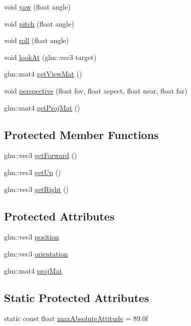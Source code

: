 \begin{DoxyCompactItemize}
void \hyperlink{class_camera_ab4eab94754431725c572d528a07a35cc}{yaw} (float angle)
\item 
void \hyperlink{class_camera_a49e00b90b94853e4485a6bdf063796de}{pitch} (float angle)
\item 
void \hyperlink{class_camera_a72be99f88b1cc21122178109d3441818}{roll} (float angle)
\item 
void \hyperlink{class_camera_ae20678234eded18bcacd5bb834862324}{look\+At} (glm\+::vec3 target)
\item 
glm\+::mat4 \hyperlink{class_camera_af2f57d81a76bf58f30c1d7ebb9531982}{get\+View\+Mat} ()
\item 
void \hyperlink{class_camera_ad51f1ae7e0ae56506b8e58f3919e89ec}{perspective} (float fov, float aspect, float near, float far)
\item 
glm\+::mat4 \hyperlink{class_camera_af030ec7f7e2774900f6522f34b080aaa}{get\+Proj\+Mat} ()
\end{DoxyCompactItemize}
\subsection*{Protected Member Functions}
\begin{DoxyCompactItemize}
\item 
glm\+::vec3 \hyperlink{class_camera_a8e94dcd032d92a96cfe8e13cab9c31a0}{get\+Forward} ()
\item 
glm\+::vec3 \hyperlink{class_camera_ab467583121fc13126a24798d17090b4d}{get\+Up} ()
\item 
glm\+::vec3 \hyperlink{class_camera_a21c35c617f5795382a7553bcbadee849}{get\+Right} ()
\end{DoxyCompactItemize}
\subsection*{Protected Attributes}
\begin{DoxyCompactItemize}
\item 
glm\+::vec3 \hyperlink{class_camera_a04b5db2c530d8630660e8cfb93a4b3b5}{position}
\item 
glm\+::vec3 \hyperlink{class_camera_a1be00c1e1049e3f682094be8d85060a8}{orientation}
\item 
glm\+::mat4 \hyperlink{class_camera_aac4ef81728f68a571955d72639f90f24}{proj\+Mat}
\end{DoxyCompactItemize}
\subsection*{Static Protected Attributes}
\begin{DoxyCompactItemize}
\item 
static const float \hyperlink{class_camera_ae9e657802de3bf87548c6888b66b5bb2}{max\+Absolute\+Attitude} = 89.\+0f
\end{DoxyCompactItemize}


